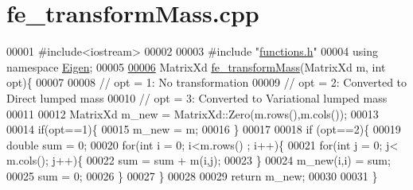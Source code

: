 \hypertarget{fe__transform_mass_8cpp_source}{}\section{fe\+\_\+transform\+Mass.\+cpp}
\label{fe__transform_mass_8cpp_source}

\begin{DoxyCode}
00001 \textcolor{preprocessor}{#include<iostream>}
00002 
00003 \textcolor{preprocessor}{#include "\hyperlink{functions_8h}{functions.h}"}
00004 \textcolor{keyword}{using namespace }\hyperlink{namespace_eigen}{Eigen};
00005 
\hyperlink{fe__transform_mass_8cpp_ab747d046148af042245ed13ca720c5ec}{00006} MatrixXd \hyperlink{fe__transform_mass_8cpp_ab747d046148af042245ed13ca720c5ec}{fe\_transformMass}(MatrixXd m, \textcolor{keywordtype}{int} opt)\{
00007 
00008     \textcolor{comment}{// opt = 1: No transformation}
00009     \textcolor{comment}{// opt = 2: Converted to Direct lumped mass}
00010     \textcolor{comment}{// opt = 3: Converted to Variational lumped mass}
00011 
00012     MatrixXd m\_new = MatrixXd::Zero(m.rows(),m.cols());
00013 
00014     \textcolor{keywordflow}{if}(opt==1)\{
00015         m\_new = m;
00016     \}
00017 
00018     \textcolor{keywordflow}{if} (opt==2)\{
00019     \textcolor{keywordtype}{double} sum = 0;
00020     \textcolor{keywordflow}{for}(\textcolor{keywordtype}{int} i = 0; i<m.rows() ; i++)\{
00021         \textcolor{keywordflow}{for}(\textcolor{keywordtype}{int} j = 0; j< m.cols(); j++)\{
00022             sum = sum + m(i,j);
00023         \}
00024         m\_new(i,i) = sum;
00025         sum = 0;
00026     \}
00027     \}
00028 
00029     \textcolor{keywordflow}{return} m\_new;
00030 
00031 \}
\end{DoxyCode}
